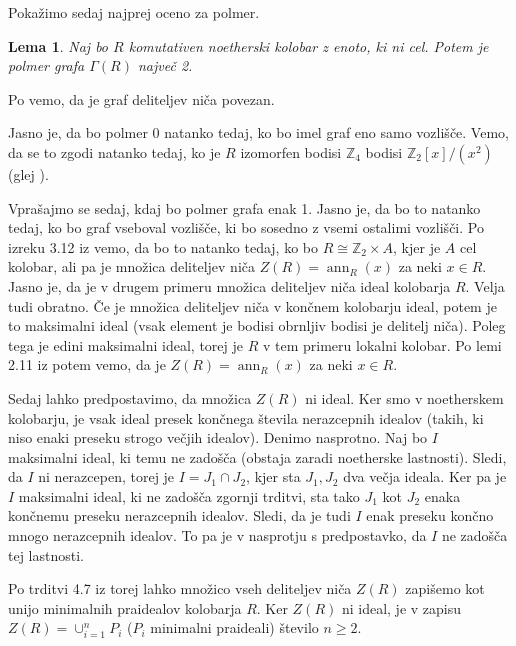 \documentclass[a4paper, 12pt]{amsart}
\theoremstyle{definition} %
\theoremstyle{plain} %
\newtheorem{lema}[definicija]{Lema}
\newcommand{\Z}{\mathbb Z}
\DeclareMathOperator{\ann}{ann}
\begin{document}
Pokažimo sedaj najprej oceno za polmer.

\begin{lema}
\label{radij}
Naj bo $R$ komutativen noetherski kolobar z enoto, ki ni cel. Potem je polmer grafa $\Gamma(R)$ največ 2.
\end{lema}

\proof
Po \cite{diploma} vemo, da je graf deliteljev niča povezan.

Jasno je, da bo polmer 0 natanko tedaj, ko bo imel graf eno samo vozlišče. Vemo, da se to zgodi natanko tedaj, ko je $R$ izomorfen bodisi $\Z_4$ bodisi $\Z_2[x]/(x^2)$ (glej \cite{Anderson-klasifikacijaMalihGrafov}).

Vprašajmo se sedaj, kdaj bo polmer grafa enak 1. Jasno je, da bo to natanko tedaj, ko bo graf vseboval vozlišče, ki bo sosedno z vsemi ostalimi vozlišči. Po izreku 3.12 iz \cite{diploma} vemo, da bo to natanko tedaj, ko bo $R\cong \Z_2 \times A$, kjer je $A$ cel kolobar, ali pa je množica deliteljev niča $Z(R) = \ann_R(x)$ za neki $x\in R$. Jasno je, da je v drugem primeru množica deliteljev niča ideal kolobarja $R$. Velja tudi obratno. Če je množica deliteljev niča v končnem kolobarju ideal, potem je to maksimalni ideal (vsak element je bodisi obrnljiv bodisi je delitelj niča). Poleg tega je edini maksimalni ideal, torej je $R$ v tem primeru lokalni kolobar. Po lemi 2.11 iz \cite{diploma} potem vemo, da je $Z(R)=\ann_R(x)$ za neki $x\in R$. 

Sedaj lahko predpostavimo, da množica $Z(R)$ ni ideal. Ker smo v noetherskem kolobarju, je vsak ideal presek končnega števila nerazcepnih idealov (takih, ki niso enaki preseku strogo večjih idealov). Denimo nasprotno. Naj bo $I$ maksimalni ideal, ki temu ne zadošča (obstaja zaradi noetherske lastnosti). Sledi, da $I$ ni nerazcepen, torej je $I=J_1\cap J_2$, kjer sta $J_1,J_2$ dva večja ideala. Ker pa je $I$ maksimalni ideal, ki ne zadošča zgornji trditvi, sta tako $J_1$ kot $J_2$ enaka končnemu preseku nerazcepnih idealov. Sledi, da je tudi $I$ enak preseku končno mnogo nerazcepnih idealov. To pa je v nasprotju s predpostavko, da $I$ ne zadošča tej lastnosti.

Po trditvi 4.7 iz \cite{Atiyah} torej lahko množico vseh deliteljev niča $Z(R)$ zapišemo kot unijo minimalnih praidealov kolobarja $R$. Ker $Z(R)$ ni ideal, je v zapisu $Z(R) = \cup_{i=1}^n P_i$ ($P_i$ minimalni praideali) število $n\ge2$.
\end{document}
